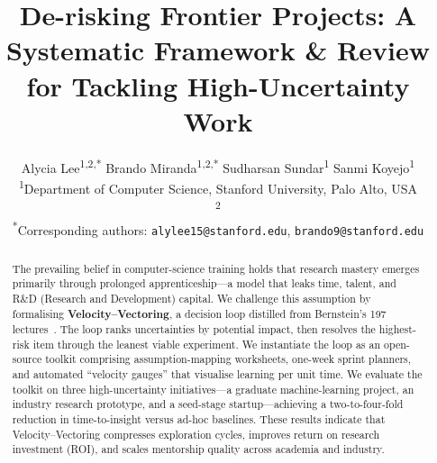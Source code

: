 \documentclass{article}
\title{De-risking Frontier Projects: A Systematic Framework \& Review for Tackling High-Uncertainty Work}
\author{
  Alycia Lee\textsuperscript{1,2,*} \And
  Brando Miranda\textsuperscript{1,2,*} \And
  Sudharsan Sundar\textsuperscript{1} \And
  Sanmi Koyejo\textsuperscript{1} \\
  \textsuperscript{1}Department of Computer Science, Stanford University, Palo Alto, USA \\
  \textsuperscript{2}\todo{Add second affiliation for footnote 2 or remove ``2'' from author superscripts} \\
  \textsuperscript{*}Corresponding authors: \texttt{alylee15@stanford.edu}, \texttt{brando9@stanford.edu}
}
\begin{document}
\maketitle

\begin{abstract}
The prevailing belief in computer-science training holds that research mastery emerges primarily through prolonged apprenticeship---a model that leaks time, talent, and R\&D (Research and Development) capital.
We challenge this assumption by formalising \textbf{Velocity--Vectoring}, a decision loop distilled from Bernstein's 197 lectures~\cite{bernstein2025cs197}.
The loop ranks uncertainties by potential impact, then resolves the highest-risk item through the leanest viable experiment.
We instantiate the loop as an open-source toolkit comprising assumption-mapping worksheets, one-week sprint planners, and automated ``velocity gauges'' that visualise learning per unit time.
We evaluate the toolkit on three high-uncertainty initiatives---a graduate machine-learning project, an industry research prototype, and a seed-stage startup---achieving a two-to-four-fold reduction in time-to-insight versus ad-hoc baselines.
These results indicate that Velocity--Vectoring compresses exploration cycles, improves return on research investment (ROI), and scales mentorship quality across academia and industry.
\end{abstract}



























\clearpage



\clearpage
\appendix

\end{document}
